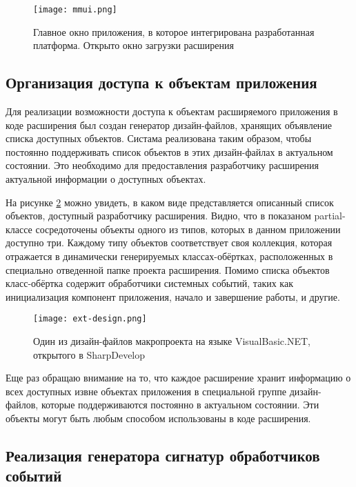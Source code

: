 \begin{figure}[!h]
    \centering
    \texttt{[image: mmui.png]}
    \caption{Главное окно приложения, в которое интегрирована разработанная платформа. Открыто окно загрузки расширения}
    \label{pic:mmui}
\end{figure}


\subsection{Организация доступа к объектам приложения}
\label{sec:ext_entry_point}

Для реализации возможности доступа к объектам расширяемого приложения в коде расширения был создан генератор дизайн-файлов, хранящих объявление списка доступных объектов. Систама реализована таким образом, чтобы постоянно поддерживать список объектов в этих дизайн-файлах в актуальном состоянии. Это необходимо для предоставления разработчику расширения актуальной информации о доступных объектах.

На рисунке \ref{pic:ext_design} можно увидеть, в каком виде представляется описанный список объектов, доступный разработчику расширения. Видно, что в показаном partial-классе сосредоточены объекты одного из типов, которых в данном приложении доступно три. Каждому типу объектов соответствует своя коллекция, которая отражается в динамически генерируемых классах-обёртках, расположенных в специально отведенной папке проекта расширения. Помимо списка объектов класс-обёртка содержит обработчики системных событий, таких как инициализация компонент приложения, начало и завершение работы, и другие.

\begin{figure}[!h]
    \centering
    \texttt{[image: ext-design.png]}
    \caption{Один из дизайн-файлов макропроекта на языке VisualBasic.NET, открытого в SharpDevelop}
    \label{pic:ext_design}
\end{figure}
 
 Еще раз обращаю внимание на то, что каждое расширение хранит информацию о всех доступных извне объектах приложения в специальной группе дизайн-файлов, которые поддерживаются постоянно в актуальном состоянии. Эти объекты могут быть любым способом использованы в коде расширения.
 

\subsection{Реализация генератора сигнатур обработчиков событий}
\label{sec:ehsg}

